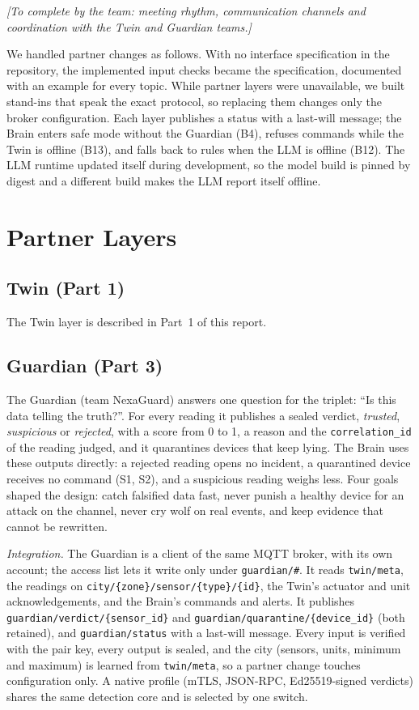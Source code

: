 \documentclass[conference]{IEEEtran}
\newcommand{\code}[1]{\texttt{\small #1}}
\begin{document}
\emph{[To complete by the team: meeting rhythm, communication channels and coordination with the Twin and Guardian teams.]}

We handled partner changes as follows. With no interface specification in the repository, the implemented input checks became the
specification, documented with an example for every topic. While partner layers were unavailable, we built stand-ins that speak the exact
protocol, so replacing them changes only the broker configuration. Each layer publishes a status with a last-will message; the Brain
enters safe mode without the Guardian (B4), refuses commands while the Twin is offline (B13), and falls back to rules when the LLM is
offline (B12). The LLM runtime updated itself during development, so the model build is pinned by digest and a different build makes
the LLM report itself offline.

\section{Partner Layers}
\subsection{Twin (Part 1)}
The Twin layer is described in Part~1 of this report.

\subsection{Guardian (Part 3)}
The Guardian (team NexaGuard) answers one question for the triplet: ``Is this data telling the truth?''. For every reading
it publishes a sealed verdict, \emph{trusted}, \emph{suspicious} or \emph{rejected}, with a score from 0 to 1, a reason and
the \code{correlation\_id} of the reading judged, and it quarantines devices that keep lying. The Brain uses these outputs
directly: a rejected reading opens no incident, a quarantined device receives no command (S1, S2), and a suspicious reading
weighs less. Four goals shaped the design: catch falsified data fast, never punish a healthy device for an attack on the
channel, never cry wolf on real events, and keep evidence that cannot be rewritten.

\emph{Integration.} The Guardian is a client of the same MQTT broker, with its own account; the access list lets it write only
under \code{guardian/\#}. It reads \code{twin/meta}, the readings on \code{city/\{zone\}/sensor/\{type\}/\{id\}}, the Twin's
actuator and unit acknowledgements, and the Brain's commands and alerts. It publishes \code{guardian/verdict/\{sensor\_id\}} and
\code{guardian/quarantine/\{device\_id\}} (both retained), and \code{guardian/status} with a last-will message. Every input is
verified with the pair key, every output is sealed, and the city (sensors, units, minimum and maximum) is learned from
\code{twin/meta}, so a partner change touches configuration only. A native profile (mTLS, JSON-RPC, Ed25519-signed verdicts)
shares the same detection core and is selected by one switch.
\end{document}
